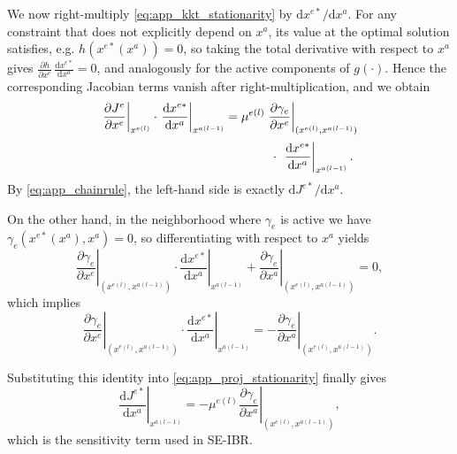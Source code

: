 \documentclass[10pt,twocolumn,letterpaper]{article}
\theoremstyle{plain}
\theoremstyle{remark}
\begin{document}
We now right-multiply \eqref{eq:app_kkt_stationarity} by
\(\mathrm{d}x^{e*}/\mathrm{d}x^a\).  
For any constraint that does not explicitly depend on \(x^a\),
its value at the optimal solution satisfies, e.g.
\(h(x^{e*}(x^a)) = 0\), so taking the total derivative with
respect to \(x^a\) gives
\(\frac{\partial h}{\partial x^e}\,\frac{\mathrm{d}x^{e*}}{\mathrm{d}x^a}=0\),
and analogously for the active components of \(g(\cdot)\).
Hence the corresponding Jacobian terms vanish after
right-multiplication, and we obtain
\begin{equation}
\begin{aligned}
\left.
\frac{\partial J^e}{\partial x^e}
\right|_{x^{e(l)}}
\cdot
\left.
\frac{\mathrm{d}x^{e*}}{\mathrm{d}x^a}
\right|_{x^{a(l-1)}}
&=
\mu^{e(l)}
\left.
\frac{\partial \gamma_e}{\partial x^e}
\right|_{(x^{e(l)},x^{a(l-1)})}
\\[2pt]
&\hspace{1.3cm}\cdot\;
\left.
\frac{\mathrm{d}x^{e*}}{\mathrm{d}x^a}
\right|_{x^{a(l-1)}}.
\end{aligned}
\label{eq:app_proj_stationarity}
\end{equation}
By \eqref{eq:app_chainrule}, the left-hand side is exactly
\(\mathrm{d}J^{e*}/\mathrm{d}x^a\).

On the other hand, in the neighborhood where
\(\gamma_e\) is active we have
\(\gamma_e(x^{e*}(x^a),x^a)=0\), so differentiating with respect
to \(x^a\) yields
\begin{equation}
\left.
\frac{\partial \gamma_e}{\partial x^e}
\right|_{(x^{e(l)},x^{a(l-1)})}
\cdot
\left.
\frac{\mathrm{d}x^{e*}}{\mathrm{d}x^a}
\right|_{x^{a(l-1)}}
+
\left.
\frac{\partial \gamma_e}{\partial x^a}
\right|_{(x^{e(l)},x^{a(l-1)})}
= 0,
\label{eq:app_constraint_derivative}
\end{equation}
which implies
\[
\left.
\frac{\partial \gamma_e}{\partial x^e}
\right|_{(x^{e(l)},x^{a(l-1)})}
\cdot
\left.
\frac{\mathrm{d}x^{e*}}{\mathrm{d}x^a}
\right|_{x^{a(l-1)}}
=
-
\left.
\frac{\partial \gamma_e}{\partial x^a}
\right|_{(x^{e(l)},x^{a(l-1)})}.
\]

Substituting this identity into
\eqref{eq:app_proj_stationarity} finally gives
\begin{equation}
\left.
\frac{\mathrm{d}J^{e*}}{\mathrm{d}x^a}
\right|_{x^{a(l-1)}}
=
-
\mu^{e(l)}
\left.
\frac{\partial \gamma_e}{\partial x^a}
\right|_{(x^{e(l)},x^{a(l-1)})},
\label{eq:app_final_sensitivity}
\end{equation}
which is the sensitivity term used in SE-IBR.
\end{document}
